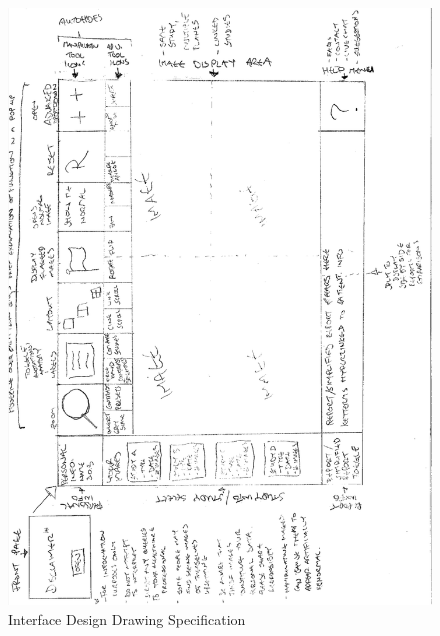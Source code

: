 \begin{figure}[ht]
\centering
\includegraphics[width = 0.80\hsize]{./figures/InterfaceDesign}
\caption{Interface Design Drawing Specification}
\end{figure}